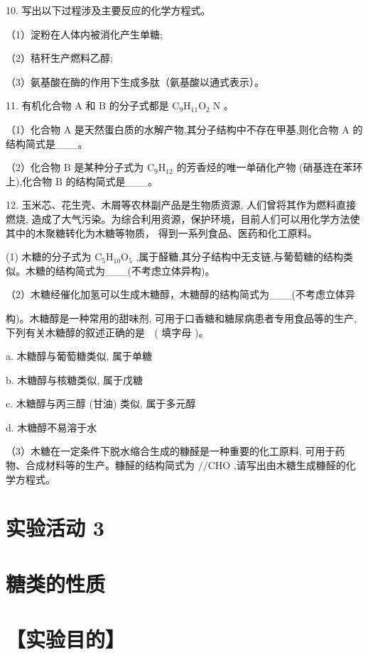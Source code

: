 \documentclass[10pt]{article}
\begin{document}
10. 写出以下过程涉及主要反应的化学方程式。

（1）淀粉在人体内被消化产生单糖;

（2）秸秆生产燃料乙醇;

（3）氨基酸在酶的作用下生成多肽（氨基酸以通式表示）。

11. 有机化合物 \(\mathrm{A}\) 和 \(\mathrm{B}\) 的分子式都是 \({\mathrm{C}}_{9}{\mathrm{H}}_{11}{\mathrm{O}}_{2}\mathrm{\;N}\) 。

（1）化合物 \(\mathrm{A}\) 是天然蛋白质的水解产物,其分子结构中不存在甲基,则化合物 \(\mathrm{A}\) 的结构简式是\_\_\_。

（2）化合物 \(\mathrm{B}\) 是某种分子式为 \({\mathrm{C}}_{9}{\mathrm{H}}_{12}\) 的芳香烃的唯一单硝化产物 (硝基连在苯环上),化合物 \(\mathrm{B}\) 的结构简式是\_\_\_。

12. 玉米芯、花生壳、木屑等农林副产品是生物质资源, 人们曾将其作为燃料直接燃烧, 造成了大气污染。为综合利用资源，保护环境，目前人们可以用化学方法使其中的木聚糖转化为木糖等物质， 得到一系列食品、医药和化工原料。

(1) 木糖的分子式为 \({\mathrm{C}}_{5}{\mathrm{H}}_{10}{\mathrm{O}}_{5}\) ,属于醛糖,其分子结构中无支链,与葡萄糖的结构类似。木糖的结构简式为\_\_\_(不考虑立体异构)。

（2）木糖经催化加氢可以生成木糖醇，木糖醇的结构简式为\_\_\_(不考虑立体异

构)。木糖醇是一种常用的甜味剂, 可用于口香糖和糖尿病患者专用食品等的生产, 下列有关木糖醇的叙述正确的是 \(\;\) ( 填字母 )。

a. 木糖醇与葡萄糖类似, 属于单糖

b. 木糖醇与核糖类似, 属于戊糖

c. 木糖醇与丙三醇 (甘油) 类似, 属于多元醇

d. 木糖醇不易溶于水

（3）木糖在一定条件下脱水缩合生成的糠醛是一种重要的化工原料, 可用于药物、合成材料等的生产。糠醛的结构简式为 \(//\mathrm{{CHO}}\) ,请写出由木糖生成糠醛的化学方程式。

\section*{实验活动 3}

\section*{糖类的性质}

\section*{【实验目的】}
\end{document}
